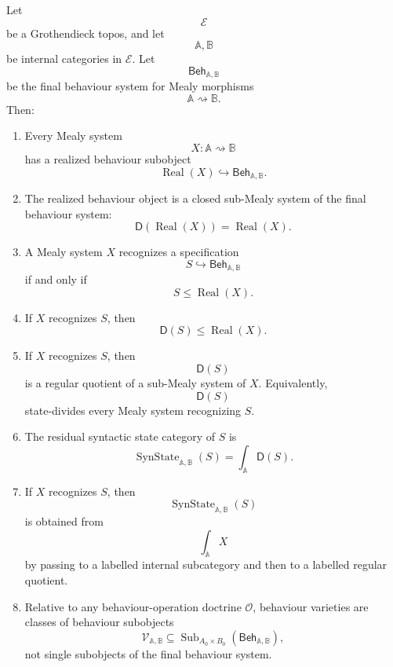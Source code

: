 \begin{theorem}
\label{thm:state-eilenberg-main-consolidation}
Let
\[
\mathcal E
\]
be a Grothendieck topos, and let
\[
\mathbb A,\mathbb B
\]
be internal categories in \(\mathcal E\). Let
\[
\mathsf{Beh}_{\mathbb A,\mathbb B}
\]
be the final behaviour system for Mealy morphisms
\[
\mathbb A\rightsquigarrow\mathbb B.
\]
Then:

\begin{enumerate}
\item Every Mealy system
\[
X:\mathbb A\rightsquigarrow\mathbb B
\]
has a realized behaviour subobject
\[
\operatorname{Real}(X)
\hookrightarrow
\mathsf{Beh}_{\mathbb A,\mathbb B}.
\]

\item The realized behaviour object is a closed sub-Mealy system of the final
behaviour system:
\[
\mathsf D(\operatorname{Real}(X))
=
\operatorname{Real}(X).
\]

\item A Mealy system \(X\) recognizes a specification
\[
S\hookrightarrow\mathsf{Beh}_{\mathbb A,\mathbb B}
\]
if and only if
\[
S\leq\operatorname{Real}(X).
\]

\item If \(X\) recognizes \(S\), then
\[
\mathsf D(S)\leq\operatorname{Real}(X).
\]

\item If \(X\) recognizes \(S\), then
\[
\mathsf D(S)
\]
is a regular quotient of a sub-Mealy system of \(X\). Equivalently,
\[
\mathsf D(S)
\]
state-divides every Mealy system recognizing \(S\).

\item The residual syntactic state category of \(S\) is
\[
\operatorname{SynState}_{\mathbb A,\mathbb B}(S)
=
\int_{\mathbb A}\mathsf D(S).
\]

\item If \(X\) recognizes \(S\), then
\[
\operatorname{SynState}_{\mathbb A,\mathbb B}(S)
\]
is obtained from
\[
\int_{\mathbb A}X
\]
by passing to a labelled internal subcategory and then to a labelled regular
quotient.

\item Relative to any behaviour-operation doctrine \(\mathcal O\), behaviour
varieties are classes of behaviour subobjects
\[
\mathcal V_{\mathbb A,\mathbb B}
\subseteq
\operatorname{Sub}_{A_0\times B_0}
(\mathsf{Beh}_{\mathbb A,\mathbb B}),
\]
not single subobjects of the final behaviour system.


\end{enumerate}
\end{theorem}
